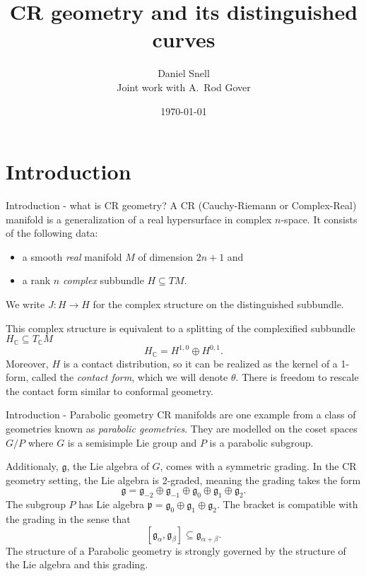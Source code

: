 \documentclass[handout]{beamer}
\title{CR geometry and its distinguished curves}
\author[Daniel Snell]{Daniel Snell\\{ \bigskip\bigskip \small Joint work with
A.\ Rod Gover}}
\date{\today}
\newcommand{\CC}{\mathbb{C}}
\begin{document}
\begin{frame}
  \titlepage
\end{frame}

\section{Introduction}
\begin{frame}{Introduction - what is CR geometry?}
  A CR (Cauchy-Riemann or Complex-Real) manifold is a generalization of a real
  hypersurface in complex $n$-space.
  \pause
  It consists of the following data:
  \begin{itemize}
    \item a smooth \emph{real} manifold $M$ of dimension $2n+1$ and
    \item a rank $n$ \emph{complex} subbundle $H \subseteq TM$.
  \end{itemize}
  \pause

  We write $J : H \to H$ for the complex structure on the distinguished subbundle. 

  This complex structure is equivalent to a splitting of the complexified subbundle $H_{\CC}
  \subseteq T_{\CC}M$
  \[
    H_\CC = H^{1,0} \oplus H^{0,1}.
  \]
  \pause 
  Moreover, $H$ is a contact distribution, so it can be realized as the kernel
  of a 1-form, called the \emph{contact form}, which we will denote $\theta$.
  There is freedom to rescale the contact form similar to conformal geometry.

\end{frame}

\begin{frame}{Introduction - Parabolic geometry}
  CR manifolds are one example from a class of geometries known as
  \emph{parabolic geometries}.
  They are modelled on the coset spaces $G/P$ where $G$ is a semisimple Lie
  group and $P$ is a parabolic subgroup.

  Additionaly, $\mathfrak{g}$, the Lie algebra of $G$, comes with a symmetric
  grading.
  In the CR geometry setting, the Lie algebra is 2-graded, meaning the grading
  takes the form
  \[
    \mathfrak{g} = \mathfrak{g}_{-2} \oplus \mathfrak{g}_{-1}\oplus
    \mathfrak{g}_{0}\oplus\mathfrak{g}_{1}\oplus \mathfrak{g}_{2}.
  \]
  The subgroup $P$ has Lie algebra $\mathfrak{p} =
  \mathfrak{g}_{0}\oplus\mathfrak{g}_{1}\oplus \mathfrak{g}_{2}$.
  The bracket is compatible with the grading in the sense that
  \[
    [\mathfrak{g}_\alpha, \mathfrak{g}_\beta] \subseteq \mathfrak{g}_{\alpha +
    \beta}.
  \]
  The structure of a Parabolic geometry is strongly governed by the structure
  of the Lie algebra and this grading.
\end{frame}
\end{document}
